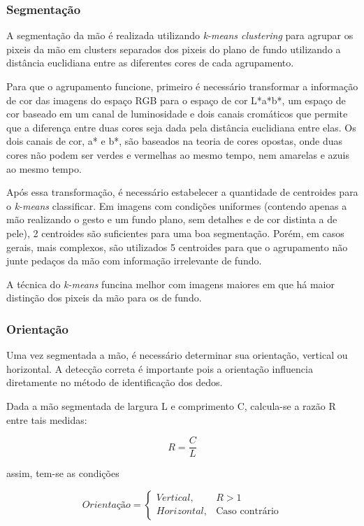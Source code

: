 \documentclass[conference]{IEEEtran}
\begin{document}
\subsubsection{Segmentação}
A segmentação da mão é realizada utilizando \textit{k-means clustering} para agrupar os pixeis da mão em clusters separados dos pixeis do plano de fundo utilizando a distância euclidiana entre as diferentes cores de cada agrupamento. 
\par Para que o agrupamento funcione, primeiro é necessário transformar a informação de cor das imagens do espaço RGB para o espaço de cor L*a*b*, um espaço de cor baseado em um canal de luminosidade e dois canais cromáticos que permite que a diferença entre duas cores seja dada pela distância euclidiana entre elas. Os dois canais de cor, a* e b*, são baseados na teoria de cores opostas, onde duas cores não podem ser verdes e vermelhas ao mesmo tempo, nem amarelas e azuis ao mesmo tempo. 
\par Após essa transformação, é necessário estabelecer a quantidade de centroides para o \textit{k-means} classificar. Em imagens com condições uniformes (contendo apenas a mão realizando o gesto e um fundo plano, sem detalhes e de cor distinta a de pele), 2 centroides são suficientes para uma boa segmentação. Porém, em casos gerais, mais complexos, são utilizados 5 centroides para que o agrupamento não junte pedaços da mão com informação irrelevante de fundo. 
\par A técnica do \textit{k-means} funcina melhor com imagens maiores em que há maior distinção dos pixeis da mão para os de fundo. 
\subsubsection{Orientação}
\par Uma vez segmentada a mão, é necessário determinar sua orientação, vertical ou horizontal. A detecção correta é importante pois a orientação influencia diretamente no método de identificação dos dedos.
\par Dada a mão segmentada de largura L e comprimento C, calcula-se a razão R entre tais medidas:

\begin{equation}\label{eqeq}
    R = \frac{C}{L}
\end{equation}

assim, tem-se as condições

\begin{equation}\label{eqeq}
    Orientação =
    \begin{cases}
      Vertical, & R > 1 \\
      Horizontal, & \text{Caso contrário}
    \end{cases}
\end{equation}
\end{document}
